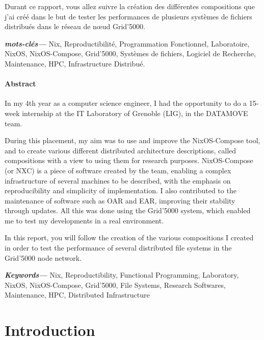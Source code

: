 \documentclass[a4paper,french,12pt, titlepage]{article}
\newcommand{\paragraphnewline}[1]{\hypertarget{par#1}{\paragraph{#1}\mbox{}}}
\begin{document}
Durant ce rapport, vous allez suivre la création des différentes
compositions que j'ai créé dans le but de tester les performances de
plusieurs systèmes de fichiers distribués dans le réseau de nœud
Grid'5000.


\textbf{\textit{mots-clés---}} Nix, Reproductibilité, Programmation
Fonctionnel, Laboratoire, NixOS, NixOS-Compose, Grid'5000, Systèmes de
fichiers, Logiciel de Recherche, Maintenance, HPC, Infrastructure
Distribué.

\begin{center}
    \item \paragraphnewline{Abstract}
\end{center}

In my 4th year as a computer science engineer, I had the opportunity to
do a 15-week internship at the IT Laboratory of Grenoble (LIG), in the
DATAMOVE team.\newline

During this placement, my aim was to use and improve the NixOS-Compose
tool, and to create various different distributed architecture
descriptions, called compositions with a view to using them for research
purposes. NixOS-Compose (or NXC) is a piece of software created by the
team, enabling a complex infrastructure of several machines to be
described, with the emphasis on reproducibility and simplicity of
implementation. I also contributed to the maintenance of software such
as OAR and EAR, improving their stability through updates. All this was
done using the Grid'5000 system, which enabled me to test my
developments in a real environment.\newline 

In this report, you will follow the creation of the various compositions
I created in order to test the performance of several distributed file
systems in the Grid'5000 node network.

\textbf{\textit{Keywords---}} Nix, Reproductibility, Functional
Programming, Laboratory, NixOS, NixOS-Compose, Grid'5000, File Systems,
Research Softwares, Maintenance, HPC, Distributed Infrastructure

\newpage

\tableofcontents
\newpage

\listoffigures

\newpage

\hypertarget{introduction}{%
\section{Introduction}\label{introduction}}
\end{document}
